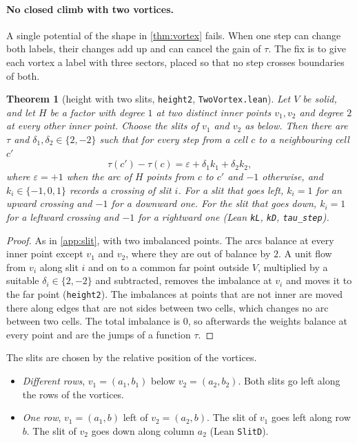 \documentclass[11pt]{article}
\theoremstyle{plain}
\newtheorem{theorem}{Theorem}[section]
\theoremstyle{definition}
\theoremstyle{remark}
\newcommand{\lean}[1]{\texttt{#1}}
\begin{document}
\paragraph{No closed climb with two vortices.}
A single potential of the shape in \cref{thm:vortex} fails.
When one step can change both labels, their changes add up and can cancel the gain of $\tau$.
The fix is to give each vortex a label with three sectors, placed so that no step crosses
boundaries of both.

\begin{theorem}[height with two slits, \lean{height2}, \lean{TwoVortex.lean}]
\label{thm:height2}
Let $V$ be solid, and let $H$ be a factor with degree $1$ at two distinct inner points $v_1,v_2$ and
degree $2$ at every other inner point.
Choose the slits of $v_1$ and $v_2$ as below.
Then there are $\tau$ and $\delta_1,\delta_2\in\{2,-2\}$ such that for every step from a cell $c$ to a
neighbouring cell $c'$
\[\tau(c')-\tau(c)=\varepsilon+\delta_1k_1+\delta_2k_2,\]
where $\varepsilon=+1$ when the arc of $H$ points from $c$ to $c'$ and $-1$ otherwise, and
$k_i\in\{-1,0,1\}$ records a crossing of slit $i$.
For a slit that goes left, $k_i=1$ for an upward crossing and $-1$ for a downward one.
For the slit that goes down, $k_i=1$ for a leftward crossing and $-1$ for a rightward one (Lean
\lean{kL}, \lean{kD}, \lean{tau\_step}).
\end{theorem}

\begin{proof}
As in \cref{app:slit}, with two imbalanced points.
The arcs balance at every inner point except $v_1$ and $v_2$, where they are out of balance by $2$.
A unit flow from $v_i$ along slit $i$ and on to a common far point outside $V$, multiplied by a
suitable $\delta_i\in\{2,-2\}$ and subtracted, removes the imbalance at $v_i$ and moves it to the far
point (\lean{height2}).
The imbalances at points that are not inner are moved there along edges that are not sides between
two cells, which changes no arc between two cells.
The total imbalance is $0$, so afterwards the weights balance at every point and are the jumps of a
function $\tau$.
\end{proof}

The slits are chosen by the relative position of the vortices.
\begin{itemize}
\item \emph{Different rows}, $v_1=(a_1,b_1)$ below $v_2=(a_2,b_2)$.
  Both slits go left along the rows of the vortices.
\item \emph{One row}, $v_1=(a_1,b)$ left of $v_2=(a_2,b)$.
  The slit of $v_1$ goes left along row $b$.
  The slit of $v_2$ goes down along column $a_2$ (Lean \lean{SlitD}).
\end{itemize}
\end{document}
